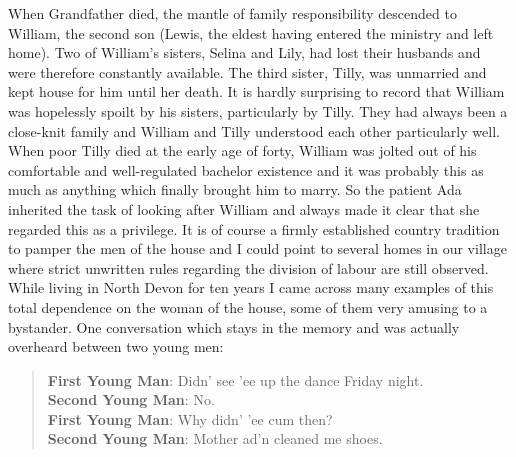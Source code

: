 When Grandfather died, the mantle of family responsibility descended to William, the second son (Lewis, the eldest having entered the ministry and left home). Two of William's sisters, Selina and Lily, had lost their husbands and were therefore constantly available. The third sister, Tilly, was unmarried and kept house for him until her death. It is hardly surprising to record that William was hopelessly spoilt by his sisters, particularly by Tilly. They had always been a close-knit family and William and Tilly understood each other particularly well. When poor Tilly died at the early age of forty, William was jolted out of his comfortable and well-regulated bachelor existence and it was probably this as much as anything which finally brought him to marry. So the patient Ada inherited the task of looking after William and always made it clear that she regarded this as a privilege. It is of course a firmly established country tradition to pamper the men of the house and I could point to several homes in our village where strict unwritten rules regarding the division of labour are still observed. While living in North Devon for ten years I came across many examples of this total dependence on the woman of the house, some of them very amusing to a bystander. One conversation which stays in the memory and was actually overheard between two young men:

\begin{quote}
\textbf{First Young Man}: Didn' see 'ee up the dance Friday night. \\
\textbf{Second Young Man}: No. \\ 
\textbf{First Young Man}: Why didn' 'ee cum then? \\
\textbf{Second Young Man}: Mother ad'n cleaned me shoes.
\end{quote}


